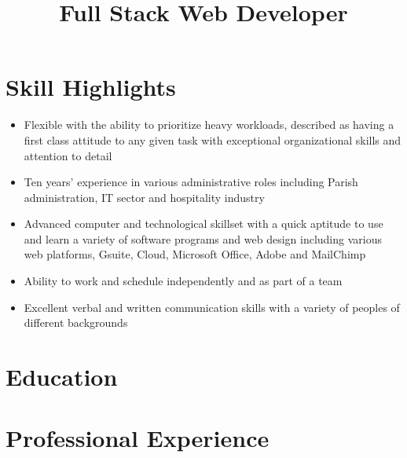 \documentclass[11pt,a4paper,sans]{moderncv}
\title{Full Stack Web Developer}          %
\begin{document}
\makecvtitle

\section{Skill Highlights} %
\label{sec:research_interests}

\begin{itemize}
	\item Flexible with the ability to prioritize heavy workloads, described as having a first class attitude to any given task with exceptional organizational skills and attention to detail
	\item Ten years’ experience in various administrative roles including Parish administration, IT sector and hospitality industry 
	\item Advanced computer and technological skillset with a quick aptitude to use and learn a variety of software programs and web design including various web platforms, Gsuite, Cloud, Microsoft Office, Adobe and MailChimp
	\item Ability to work and schedule independently and as part of a team
	\item Excellent verbal and written communication skills with a variety of peoples of different backgrounds
\end{itemize}



\section{Education}





\section{Professional Experience}
\end{document}
